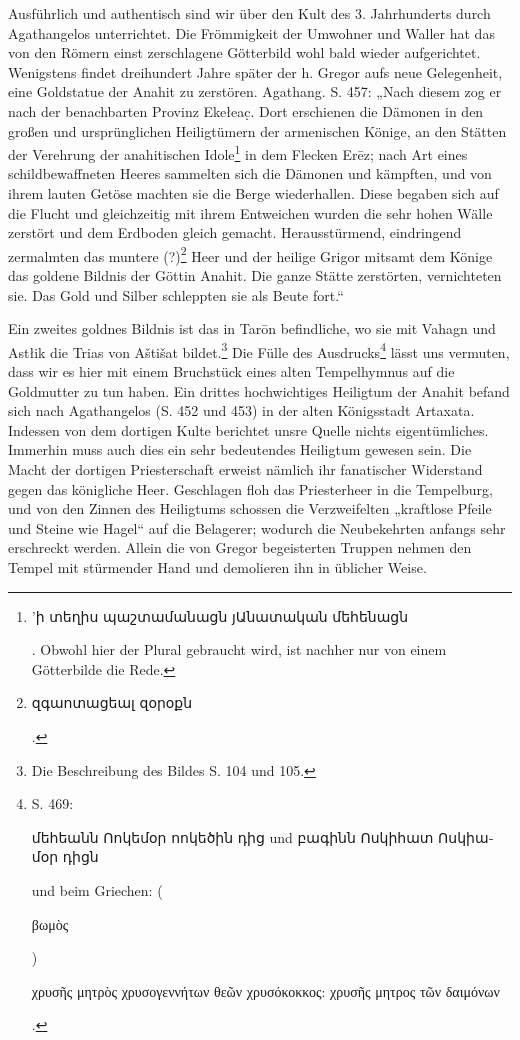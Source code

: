 \documentclass{article}
\begin{document}
Ausführlich und authentisch sind wir über den Kult des 3. Jahrhunderts durch Agathangelos unterrichtet. Die Frömmigkeit der Umwohner und Waller hat das von den Römern einst zerschlagene Götterbild wohl bald wieder aufgerichtet. Wenigstens findet dreihundert Jahre später der h. Gregor aufs neue Gelegenheit, eine Goldstatue der Anahit zu zerstören. Agathang. S. 457: „Nach diesem zog er nach der benachbarten Provinz Ekełeac̣. Dort erschienen die Dämonen in den großen und ursprünglichen Heiligtümern der armenischen Könige, an den Stätten der Verehrung der anahitischen Idole\footnote{\begin{armenian}'ի տեղիս պաշտամանացն յԱնատական մեհենացն\end{armenian}. Obwohl hier der Plural gebraucht wird, ist nachher nur von einem Götterbilde die Rede.} in dem Flecken Erēz; nach Art eines schildbewaffneten Heeres sammelten sich die Dämonen und kämpften, und von ihrem lauten Getöse machten sie die Berge wiederhallen. Diese begaben sich auf die Flucht und gleichzeitig mit ihrem Entweichen wurden die sehr hohen Wälle zerstört und dem Erdboden gleich gemacht. Herausstürmend, eindringend zermalmten das muntere (?)\footnote{\begin{armenian}զգաոտացեալ զօրօքն\end{armenian}.} Heer und der heilige Grigor mitsamt dem Könige das goldene Bildnis der Göttin Anahit. Die ganze Stätte zerstörten, vernichteten sie. Das Gold und Silber schleppten sie als Beute fort.“

Ein zweites goldnes Bildnis ist das in Tarōn befindliche, wo sie mit Vahagn und Astłik die Trias von Aštišat bildet.\footnote{Die Beschreibung des Bildes S. 104 und 105.} Die Fülle des Ausdrucks\footnote{S. 469: \begin{armenian}մեհեանն Ոոկեմօր ոոկեծին դից und բագինն Ոսկիհատ Ոսկիամօր դիցն\end{armenian} und beim Griechen: (\begin{greek}βωμὸς\end{greek}) \begin{greek}χρυσῆς μητρὸς χρυσογεννήτων θεῶν χρυσόκοκκος: χρυσῆς μητρος τῶν δαιμόνων\end{greek}.} lässt uns vermuten, dass wir es hier mit einem Bruchstück eines alten Tempelhymnus auf die Goldmutter zu tun haben. Ein drittes hochwichtiges Heiligtum der Anahit befand sich nach Agathangelos (S. 452 und 453) in der alten Königsstadt Artaxata. Indessen von dem dortigen Kulte berichtet unsre Quelle nichts eigentümliches. Immerhin muss auch dies ein sehr bedeutendes Heiligtum gewesen sein. Die Macht der dortigen Priesterschaft erweist nämlich ihr fanatischer Widerstand gegen das königliche Heer. Geschlagen floh das Priesterheer in die Tempelburg, und von den Zinnen des Heiligtums schossen die Verzweifelten „kraftlose Pfeile und Steine wie Hagel“ auf die Belagerer; wodurch die Neubekehrten anfangs sehr erschreckt werden. Allein die von Gregor begeisterten Truppen nehmen den Tempel mit stürmender Hand und demolieren ihn in üblicher Weise.
\end{document}
